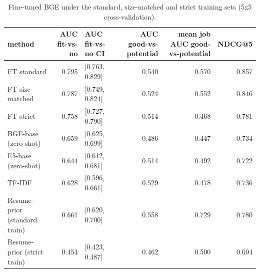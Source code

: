 \begin{table}
\caption{Fine-tuned BGE under the standard, size-matched and strict training sets (5x5 cross-validation).}
\label{tab:t4_memorisation}
\begin{tabular}{lrlrrr}
\toprule
method & AUC fit-vs-no & AUC fit-vs-no CI & AUC good-vs-potential & mean job AUC good-vs-potential & NDCG@5 \\
\midrule
FT standard & 0.795 & [0.763, 0.829] & 0.540 & 0.570 & 0.857 \\
FT size-matched & 0.787 & [0.749, 0.824] & 0.524 & 0.552 & 0.846 \\
FT strict & 0.758 & [0.727, 0.790] & 0.514 & 0.468 & 0.781 \\
BGE-base (zero-shot) & 0.659 & [0.625, 0.699] & 0.486 & 0.447 & 0.734 \\
E5-base (zero-shot) & 0.644 & [0.612, 0.681] & 0.514 & 0.492 & 0.722 \\
TF-IDF & 0.628 & [0.596, 0.661] & 0.529 & 0.478 & 0.736 \\
Resume-prior (standard train) & 0.661 & [0.620, 0.700] & 0.558 & 0.729 & 0.780 \\
Resume-prior (strict train) & 0.454 & [0.423, 0.487] & 0.462 & 0.500 & 0.694 \\
\bottomrule
\end{tabular}
\end{table}
